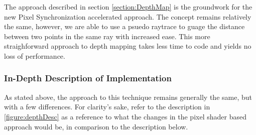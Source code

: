 \documentclass[a4paper, 12pt]{article}
\begin{document}
The approach described in section \ref{section:DepthMap} is the groundwork for
the new Pixel Synchronization accelerated approach. The concept remains
relatively the same, however, we are able to use a psuedo raytrace to guage
the distance between two points in the same ray with increased ease. This more
straighforward approach to depth mapping takes less time to code and yields no
loss of performance.

\subsubsection{In-Depth Description of Implementation}

As stated above, the approach to this technique remains generally the same,
but with a few differences. For clarity's sake, refer to the description in
\ref{figure:depthDesc} as a reference to what the changes in the pixel shader
based approach would be, in comparison to the description below.
\end{document}
